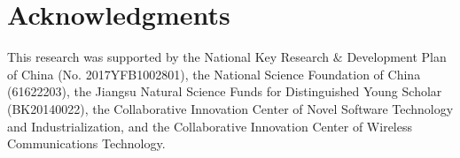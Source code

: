 \documentclass[conference]{IEEEtran}
\begin{document}
\section*{Acknowledgments}
This research was supported by the National Key Research $\&$ Development Plan of China (No. 2017YFB1002801), the National Science Foundation of China (61622203), the Jiangsu Natural Science Funds for Distinguished Young Scholar (BK20140022), the Collaborative Innovation Center of Novel Software Technology and Industrialization, and the Collaborative Innovation Center of Wireless Communications Technology.




\end{document}

